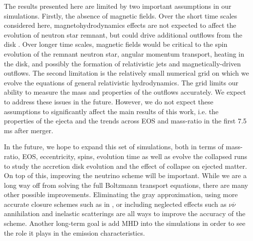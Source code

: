 The results presented here are limited by two important assumptions in our simulations. Firstly, the absence of magnetic fields. Over the short time scales considered here, magnetohydrodynamics effects are not expected to affect the evolution of neutron star remnant, but could drive additional outflows from the disk \cite{kiuchi2014,neilsen2014magnetized}. Over longer time scales, magnetic fields would be critical to the spin evolution of the remnant neutron star, angular momentum transport, heating in the disk, and possibly the formation of relativistic jets and magnetically-driven outflows. The second limitation is the relatively small numerical grid on which we evolve the equations of general relativistic hydrodynamics. The grid limits our ability to measure the mass and properties of the outflows accurately. We expect to address these issues in the future. However, we do not expect these assumptions to significantly affect the main results of this work, i.e. the properties of the ejecta and the trends across EOS and mass-ratio in the first 7.5 ms after merger.

In the future, we hope to expand this set of simulations, both in terms of mass-ratio, EOS, eccentricity, spins, evolution time as well as evolve the collapsed runs to study the accretion disk evolution and the effect of collapse on ejected matter. On top of this, improving the neutrino scheme will be important. While we are a long way off from solving the full Boltzmann transport equations, there are many other possible improvements. Eliminating the gray approximation, using more accurate closure schemes such as in \cite{foucart:2017mbt}, or including neglected effects such as $\nu\overline\nu$ annihilation and inelastic scatterings are all ways to improve the accuracy of the scheme. Another long-term goal is add MHD into the simulations in order to see the role it plays in the emission characteristics.
